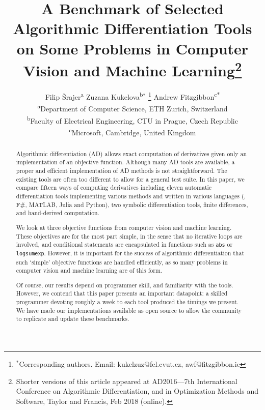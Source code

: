 \documentclass[suppldata]{article}
\begin{document}
\pagestyle{myheadings}


\title{
A Benchmark of Selected Algorithmic Differentiation Tools on
Some Problems in Computer Vision and Machine Learning\thanks
{Shorter versions of this article appeared at AD2016---7th International Conference on Algorithmic Differentiation, and in Optimization Methods and Software, Taylor and Francis, Feb 2018 (online).%
}}


\author{
Filip \v Srajer\textsuperscript{a} 
\qquad
Zuzana Kukelova\textsuperscript{b}$^{\ast}$%
\thanks{$^\ast$Corresponding authors. Email: kukelzuz@fel.cvut.cz, awf@fitzgibbon.ie} 
\qquad
Andrew Fitzgibbon\textsuperscript{c$\ast$}
\\
\textsuperscript{a}Department of Computer Science, ETH Zurich, Switzerland\\
\textsuperscript{b}Faculty of Electrical Engineering, CTU in Prague, Czech Republic \\
\textsuperscript{c}Microsoft, Cambridge, United Kingdom
}

\maketitle

\begin{abstract}
Algorithmic differentiation (AD) allows exact computation of derivatives given only an implementation of an objective function.  Although many AD tools are available, a proper and efficient implementation of AD methods is not straightforward. The existing tools are often too different to allow for a general test suite. In this paper, we compare fifteen ways of computing derivatives including eleven automatic differentiation tools implementing various methods and written in various languages (\Cpp{}, F\#, MATLAB, Julia and Python), two symbolic differentiation tools, finite differences, and hand-derived computation.

We look at three objective functions from computer vision and machine learning. These objectives are for the most part simple, in the sense that no iterative loops are involved, and conditional statements are encapsulated in functions such as {\tt abs} or {\tt logsumexp}. However, it is important for the success of algorithmic differentiation that such `simple' objective functions are handled efficiently, as so many problems in computer vision and machine learning are of this form.

Of course, our results depend on programmer skill, and familiarity with the tools.  However, we contend that this paper presents an important datapoint: a skilled programmer devoting roughly a week to each tool produced the timings we present.  We have made our implementations available as open source to allow the community to replicate and update these benchmarks.
\end{abstract}
\end{document}
